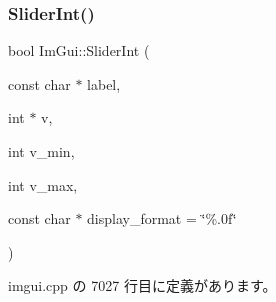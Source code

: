\subsubsection{\texorpdfstring{Slider\+Int()}{SliderInt()}}
{\footnotesize\ttfamily bool Im\+Gui\+::\+Slider\+Int (\begin{DoxyParamCaption}\item[{const char $\ast$}]{label,  }\item[{int $\ast$}]{v,  }\item[{int}]{v\+\_\+min,  }\item[{int}]{v\+\_\+max,  }\item[{const char $\ast$}]{display\+\_\+format = {\ttfamily \char`\"{}\%.0f\char`\"{}} }\end{DoxyParamCaption})}



 imgui.\+cpp の 7027 行目に定義があります。

